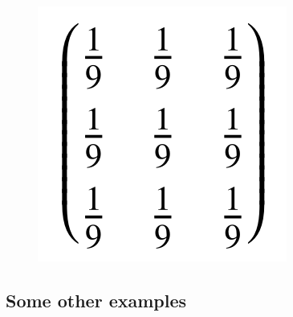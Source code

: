\begin{figure}[H]
{		\includegraphics[width=.25\textwidth]{6DL/figures/xu-0401/blur--.png}
	}
	\quad
\end{figure}



\iffalse
\subsection{Some other examples}


